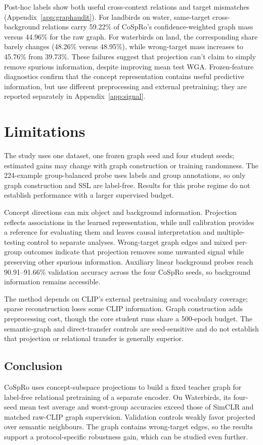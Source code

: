 \documentclass{article}
\begin{document}
Post-hoc labels show both useful cross-context relations and target mismatches (Appendix~\ref{app:graphaudit}). For landbirds on water, same-target cross-background relations carry 59.22\% of CoSpRo's confidence-weighted graph mass versus 44.96\% for the raw graph. For waterbirds on land, the corresponding share barely changes (48.26\% versus 48.95\%), while wrong-target mass increases to 45.76\% from 39.73\%. These failures suggest that projection can't claim to simply remove spurious information, despite improving mean test WGA. Frozen-feature diagnostics confirm that the concept representation contains useful predictive information, but use different preprocessing and external pretraining; they are reported separately in Appendix~\ref{app:signal}.

\section{Limitations}
The study uses one dataset, one frozen graph seed and four student seeds; estimated gains may change with graph construction or training randomness. The 224-example group-balanced probe uses labels and group annotations, so only graph construction and SSL are label-free. Results for this probe regime do not establish performance with a larger supervised budget.

Concept directions can mix object and background information. Projection reflects associations in the learned representation, while null calibration provides a reference for evaluating them and leaves causal interpretation and multiple-testing control to separate analyses. Wrong-target graph edges and mixed per-group outcomes indicate that projection removes some unwanted signal while preserving other spurious information. Auxiliary linear background probes reach 90.91--91.66\% validation accuracy across the four CoSpRo seeds, so background information remains accessible.

The method depends on CLIP's external pretraining and vocabulary coverage; sparse reconstruction loses some CLIP information. Graph construction adds preprocessing cost, though the core student runs share a 500-epoch budget. The semantic-graph and direct-transfer controls are seed-sensitive and do not establish that projection or relational transfer is generally superior.

\begin{samepage}
\section{Conclusion}
CoSpRo uses concept-subspace projections to build a fixed teacher graph for label-free relational pretraining of a separate encoder. On Waterbirds, its four-seed mean test average and worst-group accuracies exceed those of SimCLR and matched raw-CLIP graph supervision. Validation controls weakly favor projected over semantic neighbours. The graph contains wrong-target edges, so the results support a protocol-specific robustness gain, which can be studied even further.
\end{samepage}
\end{document}
